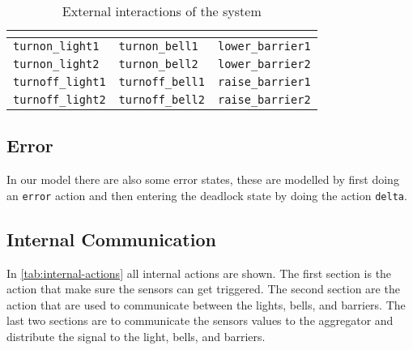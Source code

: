 \documentclass[final]{report}
\begin{document}
\begin{table}[H]
    \centering
    \caption{External interactions of the system}
    \label{tab:external-actions}
    \begin{tabular}{lll}
        \toprule
        \textbf{\nameref{sec:architecture-light-controller}} & \textbf{\nameref{sec:architecture-bell-controller}} & \textbf{\nameref{sec:architecture-barrier-controller}} \\ 
        \midrule
        \texttt{turnon\_light1}                     & \texttt{turnon\_bell1}                     & \texttt{lower\_barrier1} \\
        \texttt{turnon\_light2}                     & \texttt{turnon\_bell2}                     & \texttt{lower\_barrier2} \\
        \texttt{turnoff\_light1}                    & \texttt{turnoff\_bell1}                    & \texttt{raise\_barrier1} \\
        \texttt{turnoff\_light2}                    & \texttt{turnoff\_bell2}                    & \texttt{raise\_barrier2} \\ 
        \bottomrule
    \end{tabular}
    
\end{table}

\subsection{Error}
In our model there are also some error states, these are modelled by first doing an \texttt{error} action and then entering the deadlock state by doing the action \texttt{delta}.


\subsection{Internal Communication}
In \cref{tab:internal-actions} all internal actions are shown.
The first section is the action that make sure the sensors can get triggered.
The second section are the action that are used to communicate between the lights, bells, and barriers.
The last two sections are to communicate the sensors values to the aggregator and distribute the signal to the light, bells, and barriers.
\end{document}
